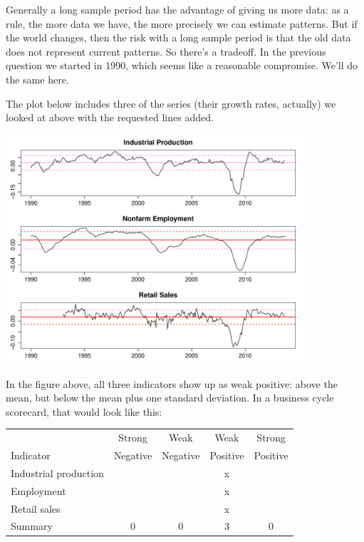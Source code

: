 \documentclass[12pt]{exam}
\begin{document}
\begin{questions}
\begin{solution}
\begin{parts}
\item Generally a long sample period has the advantage of giving us more data:
as a rule, the more data we have, the more precisely we can estimate patterns.
But if the world changes, then the risk with a long sample period is that the old data
does not represent current patterns.  
So there's a tradeoff.  
In the previous question we started in 1990, which seems like a reasonable compromise.  
We'll do the same here.  

The plot below includes three of the series (their growth rates, actually)
we looked at above with the requested lines added.

\begin{center}
\includegraphics[width=0.85\textwidth]{scorecard.pdf}
\end{center}

\item In the figure above, all three indicators 
show up as weak positive:  above the mean, but below the mean
plus one standard deviation.  
In a business cycle scorecard, that would look like this:  

\begin{center}
\begin{tabular}{lcccc}
\toprule
            &  Strong    &  Weak  &  Weak   &  Strong  \\
Indicator   &  Negative  & Negative & Positive & Positive \\
\midrule
Industrial production  &&& x \\
Employment             &&  & x \\
Retail sales            & & & x \\
\midrule
Summary                & 0 & 0 & 3 & 0 \\
\bottomrule
\end{tabular}
\end{center}


\end{parts}
\end{solution}
\end{questions}
\end{document}
